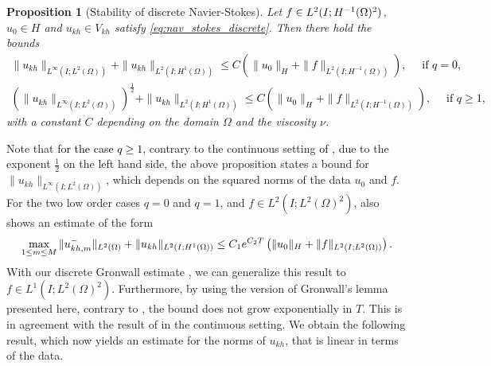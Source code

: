 \documentclass{m2an}
\newcommand\blue[1]{\textcolor{black}{#1}}
\newtheorem{proposition}[theorem]{Proposition}
\newcommand{\R}{\mathbb{R}}
\newcommand{\Vkh}{V_{kh}}
\newcommand{\ukh}{u_{kh}}
\newcommand{\LtwoHone}{L^2(I;H^1(\Omega))}
\begin{document}
\begin{proposition}[Stability of discrete Navier-Stokes]
  Let $f \in L^2(I;\blue{H^{-1}(\Omega)^2})$, $u_0 \in H$ and $u_{kh} \in \Vkh$ satisfy
  \eqref{eq:nav_stokes_discrete}.
  Then there hold the bounds
  \blue{
  \begin{align*}
    \|\ukh\|_{L^\infty(I;L^2(\Omega))} 
    + \|\ukh\|_{\LtwoHone} \le C \left(\|u_0\|_H + \|f\|_{L^2(I;H^{-1}(\Omega))}\right),
    \quad \text{ if } q = 0,\\
    \left(\|\ukh\|_{L^\infty(I;L^2(\Omega))}\right)^{\frac{1}{2}} 
    + \|\ukh\|_{\LtwoHone} \le C \left(\|u_0\|_H + \|f\|_{L^2(I;H^{-1}(\Omega))}\right), \quad \text{ if } q \ge 1,
  \end{align*}
}
  with a constant $C$ depending on the domain $\Omega$ and the viscosity $\nu$.
\end{proposition}
Note that \blue{for the case $q \ge 1$}, contrary to the continuous setting
\blue{of} ,
due to the exponent $\frac{1}{2}$ on the left hand side,
the above proposition states a bound for
$\|\ukh\|_{L^\infty(I;L^2(\Omega))}$, which depends on the squared norms of the data $u_0$ and $f$.
For the two low order cases $q=0$ and $q=1$, and $f\in L^2(I;L^2(\Omega)^2)$,
\cite[Lemma 5.1]{Chrysafinos2010} also shows an estimate of the form
  \begin{equation*}
    \max_{1\le m \le M} \|u_{kh,m}^-\|_{L^2(\Omega)} + \|\ukh\|_{\blue{\LtwoHone}}
    \le C_1 e^{C_2 T} \left(\|u_0\|_H + \|f\|_{L^2(I;L^2(\Omega))}\right).
  \end{equation*}
  With our discrete Gronwall estimate ,
  we can generalize this result to $f \in L^1(I;L^2(\Omega)^2)$.
  Furthermore, by using the version of Gronwall's lemma presented here,
  contrary to \cite{Chrysafinos2010}, the bound does not grow exponentially in $T$. This is in
  agreement with the result of  in the continuous setting.
  We obtain the following result, which now yields an estimate for the norms of $\ukh$, that is linear
  in terms of the data.
\end{document}
